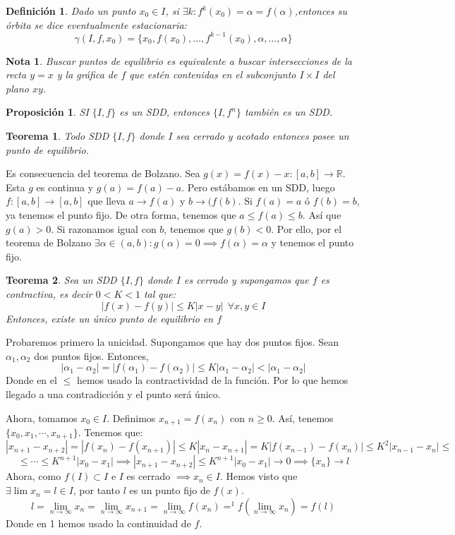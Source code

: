 \documentclass[11pt, a4paper, titlepage]{article}
\makeatletter
\renewenvironment{proof}[1][\proofname] {\vspace{-15pt}\par\pushQED{\qed}\normalfont\topsep6\p@\@plus6\p@\relax\trivlist\item[\hskip\labelsep\it#1\@addpunct{.}]\ignorespaces}{\popQED\endtrivlist\@endpefalse}
\newcommand{\R}{\mathbb{R}}
\theoremstyle{theorem-style}
\newtheorem*{nth}{Teorema}
\newtheorem*{nprop}{Proposición}
\theoremstyle{definition-style}
\newtheorem*{ndef}{Definición}
\theoremstyle{remark-style}
\newtheorem*{nota}{Nota}
\theoremstyle{example-style}
\makeatother
\begin{document}
\begin{ndef}
	Dado un punto $x_0 \in I$, si $\exists k: f^k(x_0) = \alpha = f(\alpha)$,entonces su órbita se dice eventualmente estacionaria:
	\[
	\gamma(I,f,x_0) = \{x_0, f(x_0), \dots, f^{k-1}(x_0), \alpha, \dots, \alpha\}
	\]
\end{ndef}
\begin{nota}
	Buscar puntos de equilibrio es equivalente a buscar intersecciones de la recta $y=x$ y la gráfica de $f$ que estén contenidas en el subconjunto $I\times I$ del plano $xy$.
\end{nota}

\begin{nprop}
	SI $\{I,f\}$ es un SDD, entonces $\{I,f^n\}$ también es un SDD.
\end{nprop}

\begin{nth}
	Todo SDD $\{I,f\}$ donde $I$ sea cerrado y acotado entonces posee un punto de equilibrio.
\end{nth}
\begin{proof}
	Es consecuencia del teorema de Bolzano. Sea $g(x) = f(x)-x :[a,b] \to \R$. Esta $g$ es continua y $g(a) = f(a)-a$. Pero estábamos en un SDD, luego $f:[a,b] \to [a,b]$ que lleva $a \to f(a) $ y $b \to(f(b)$. Si $f(a) = a $ ó $f(b) = b$, ya tenemos el punto fijo. De otra forma, tenemos que  $a \leq f(a) \leq b$.
	Así que $g(a) > 0$. Si razonamos igual con $b$, tenemos que $g(b) < 0$. 
	Por ello, por el teorema de Bolzano $\exists \alpha \in (a,b) : g(\alpha) = 0 \implies f(\alpha) = \alpha $ y tenemos el punto fijo.
	

\end{proof}
\begin{nth}
	Sea un SDD $\{I,f\}$ donde $I$ es cerrado y supongamos que $f$ es contractiva, es decir $0 < K < 1$ tal que:
	\[
	|f(x)-f(y)| \leq K |x-y| \ \ \forall x,y \in I
	\]
Entonces, existe un único punto de equilibrio en $f$
\end{nth}

\begin{proof}
	Probaremos primero la unicidad. Supongamos que hay dos puntos fijos. Sean $\alpha_1, \alpha_2$ dos puntos fijos. Entonces,
	 \[
	|\alpha_1 - \alpha_2| = |f(\alpha_1)- f(\alpha_2)| \leq K |\alpha_1 - \alpha_2| < |\alpha_1 - \alpha_2|
	\]
	Donde en el $\leq$ hemos usado la contractividad de la función. Por lo que hemos llegado a una contradicción y el punto será único.
	
	Ahora, tomamos $x_0\in I$. Definimos $x _{n+1} = f(x_n) $ con $n\geq 0$. Así, tenemos $\{x_0,x_1,\cdots , x _{n+1}\}$. Tenemos que:
	\[
	|x _{n+1} - x _{n+2}| = |f(x_n) - f(x _{n+1})| \leq K |x_n - x _{n+1}|= K |f(x _{n-1})- f(x_n)| \leq K^2|x _{n-1}-x_n| \leq 
	\]
	\[
	\leq \cdots \leq K^{n+1}|x_0 - x_1| \implies |x _{n+1}- x _{n+2}| \leq K^{n+1}|x_0-x_1| \to 0 \implies \{x_n\} \to l 
	\]
	Ahora, como $f(I)\subset I$ e $I$ es cerrado $\implies x_n \in I $. 
	Hemos visto que $\exists \lim x_n = l \in I$, por tanto $l$ es un punto fijo de $f(x)$.
	\[
	l =  \lim_{n\to \infty}x_n = \lim_{n\to \infty}x_{n+1} = \lim_{n\to \infty}f(x_n) =^1 f(\lim_{n\to \infty}x_n) = f(l)  
	\]
	Donde en 1 hemos usado la continuidad de $f$.
\end{proof}
\end{document}
